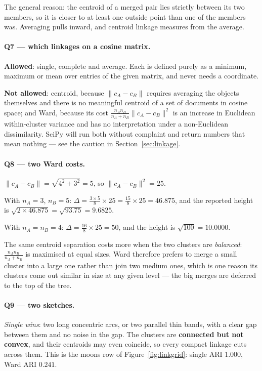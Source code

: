 \documentclass[11pt]{article}
\begin{document}
The general reason: the centroid of a merged pair lies strictly between its
two members, so it is closer to at least one outside point than one of the
members was. Averaging pulls inward, and centroid linkage measures from the
average.

\paragraph{Q7 --- which linkages on a cosine matrix.}
\textbf{Allowed}: single, complete and average. Each is defined purely as a
minimum, maximum or mean over entries of the given matrix, and never needs a
coordinate.

\textbf{Not allowed}: centroid, because $\lVert c_A - c_B \rVert$ requires
averaging the objects themselves and there is no meaningful centroid of a set
of documents in cosine space; and Ward, because its cost
$\frac{n_A n_B}{n_A+n_B}\lVert c_A - c_B\rVert^2$ is an increase in Euclidean
within-cluster variance and has no interpretation under a non-Euclidean
dissimilarity. SciPy will run both without complaint and return numbers that
mean nothing --- see the caution in Section~\ref{sec:linkage}.

\paragraph{Q8 --- two Ward costs.}
$\lVert c_A - c_B \rVert = \sqrt{4^2 + 3^2} = 5$, so
$\lVert c_A - c_B\rVert^2 = 25$.

With $n_A = 3$, $n_B = 5$: $\Delta = \frac{3 \times 5}{8} \times 25 =
\frac{15}{8} \times 25 = 46.875$, and the reported height is
$\sqrt{2 \times 46.875} = \sqrt{93.75} = 9.6825$.

With $n_A = n_B = 4$: $\Delta = \frac{16}{8} \times 25 = 50$, and the height
is $\sqrt{100} = 10.0000$.

The same centroid separation costs more when the two clusters are
\emph{balanced}: $\frac{n_A n_B}{n_A + n_B}$ is maximised at equal sizes.
Ward therefore prefers to merge a small cluster into a large one rather than
join two medium ones, which is one reason its clusters come out similar in
size at any given level --- the big merges are deferred to the top of the
tree.

\paragraph{Q9 --- two sketches.}
\emph{Single wins}: two long concentric arcs, or two parallel thin bands, with
a clear gap between them and no noise in the gap. The clusters are
\textbf{connected but not convex}, and their centroids may even coincide, so
every compact linkage cuts across them. This is the moons row of
Figure~\ref{fig:linkgrid}: single ARI $1.000$, Ward ARI $0.241$.
\end{document}
